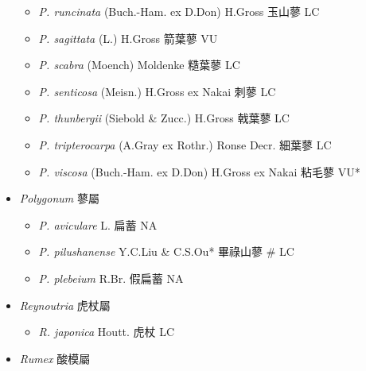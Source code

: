\begin{itemize}
\begin{itemize}
        \item[] \textit{P. runcinata} (Buch.-Ham. ex D.Don) H.Gross  玉山蓼   LC
        \item[] \textit{P. sagittata} (L.) H.Gross  箭葉蓼   VU
        \item[] \textit{P. scabra} (Moench) Moldenke  糙葉蓼   LC
        \item[] \textit{P. senticosa} (Meisn.) H.Gross ex Nakai  刺蓼   LC
        \item[] \textit{P. thunbergii} (Siebold \& Zucc.) H.Gross  戟葉蓼   LC
        \item[] \textit{P. tripterocarpa} (A.Gray ex Rothr.) Ronse Decr.  細葉蓼   LC
        \item[] \textit{P. viscosa} (Buch.-Ham. ex D.Don) H.Gross ex Nakai  粘毛蓼   VU*
  \end{itemize}
 \item[] \textit{Polygonum} 蓼屬
                                
  \begin{itemize}
        \item[] \textit{P. aviculare} L.  扁蓄   NA
        \item[] \textit{P. pilushanense} Y.C.Liu \& C.S.Ou*  畢祿山蓼  \# LC
        \item[] \textit{P. plebeium} R.Br.  假扁蓄   NA
  \end{itemize}
 \item[] \textit{Reynoutria} 虎杖屬
                                
  \begin{itemize}
        \item[] \textit{R. japonica} Houtt.  虎杖   LC
  \end{itemize}
 \item[] \textit{Rumex} 酸模屬
                                

\end{itemize}
